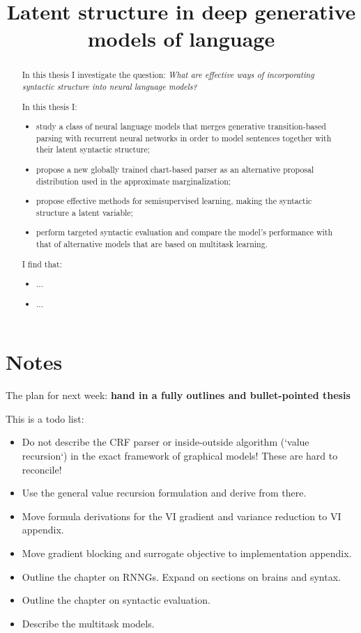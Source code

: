 \documentclass[examplefnt,biber]{../src/nowfnt} %
\title{Latent structure in deep generative models of language}
\begin{document}
\makeabstracttitle

\begin{abstract}
In this thesis I investigate the question: \textit{What are effective ways of incorporating syntactic structure into neural language models?}

In this thesis I:
\begin{itemize}
  \item study a class of neural language models that merges generative transition-based parsing with recurrent neural networks in order to model sentences together with their latent syntactic structure;
  \item propose a new globally trained chart-based parser as an alternative proposal distribution used in the approximate marginalization;
  \item propose effective methods for semisupervised learning, making the syntactic structure a latent variable;
  \item perform targeted syntactic evaluation and compare the model's performance with that of alternative models that are based on multitask learning.
\end{itemize}
I find that:
\begin{itemize}
  \item ...
  \item ...
\end{itemize}
\end{abstract}

\chapter{Notes}
The plan for next week: \textbf{hand in a fully outlines and bullet-pointed thesis}

This is a todo list:
\begin{itemize}
  \item Do not describe the CRF parser or inside-outside algorithm (`value recursion`) in the exact framework of graphical models! These are hard to reconcile!
  \item Use the general value recursion formulation and derive from there.
  \item Move formula derivations for the VI gradient and variance reduction to VI appendix.
  \item Move gradient blocking and surrogate objective to implementation appendix.
  \item Outline the chapter on RNNGs. Expand on sections on brains and syntax.
  \item Outline the chapter on syntactic evaluation.
  \item Describe the multitask models.
\end{itemize}
\end{document}
